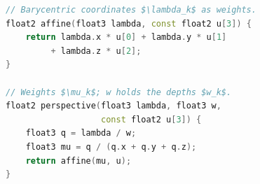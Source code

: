 \begin{lstlisting}[language=C++, float=t, mathescape=true, morekeywords={float2, float3},
    label=lst:Interpolation, caption={\captiontitle{Texture Coordinates of a Pixel}
    Affine interpolation weights the texture coordinates with the barycentric coordinates $\lambda_k$,
    perspective-correct interpolation with the weights $\mu_k$ of \cref{eq:Weights}.}]
// Barycentric coordinates $\lambda_k$ as weights.
float2 affine(float3 lambda, const float2 u[3]) {
    return lambda.x * u[0] + lambda.y * u[1]
         + lambda.z * u[2];
}

// Weights $\mu_k$; w holds the depths $w_k$.
float2 perspective(float3 lambda, float3 w,
                   const float2 u[3]) {
    float3 q = lambda / w;
    float3 mu = q / (q.x + q.y + q.z);
    return affine(mu, u);
}
\end{lstlisting}
